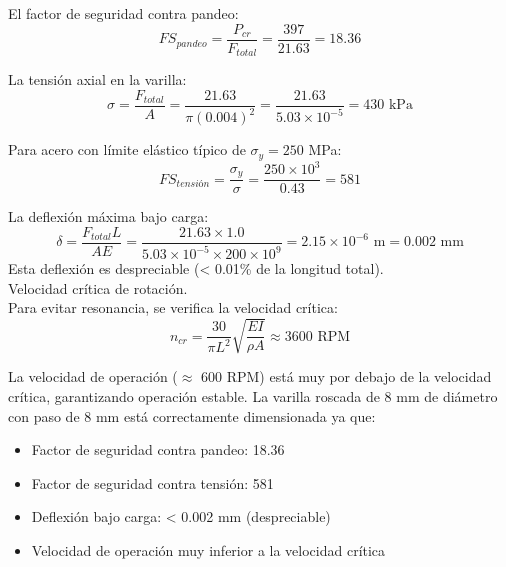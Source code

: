 El factor de seguridad contra pandeo:
\begin{equation}
FS_{pandeo} = \frac{P_{cr}}{F_{total}} = \frac{397}{21.63} = 18.36
\end{equation}

La tensión axial en la varilla:
\begin{equation}
\sigma = \frac{F_{total}}{A} = \frac{21.63}{\pi (0.004)^2} = \frac{21.63}{5.03 \times 10^{-5}} = 430 \text{ kPa}
\end{equation}

Para acero con límite elástico típico de $\sigma_y = 250$ MPa:
\begin{equation}
FS_{tensión} = \frac{\sigma_y}{\sigma} = \frac{250 \times 10^3}{0.43} = 581
\end{equation}

La deflexión máxima bajo carga:
\begin{equation}
\delta = \frac{F_{total} L}{A E} = \frac{21.63 \times 1.0}{5.03 \times 10^{-5} \times 200 \times 10^9} = 2.15 \times 10^{-6} \text{ m} = 0.002 \text{ mm}
\end{equation}
Esta deflexión es despreciable (< 0.01\% de la longitud total).\\

Velocidad crítica de rotación.\\
Para evitar resonancia, se verifica la velocidad crítica:
\begin{equation}
n_{cr} = \frac{30}{\pi L^2} \sqrt{\frac{E I}{\rho A}} \approx 3600 \text{ RPM}
\end{equation}

La velocidad de operación ($\approx$ 600 RPM) está muy por debajo de la velocidad crítica, garantizando operación estable.
La varilla roscada de 8 mm de diámetro con paso de 8 mm está correctamente dimensionada ya que:
\begin{itemize}[label=$\bullet$]
        \item Factor de seguridad contra pandeo: 18.36
        \item Factor de seguridad contra tensión: 581
        \item Deflexión bajo carga: < 0.002 mm (despreciable)
        \item Velocidad de operación muy inferior a la velocidad crítica
\end{itemize}
